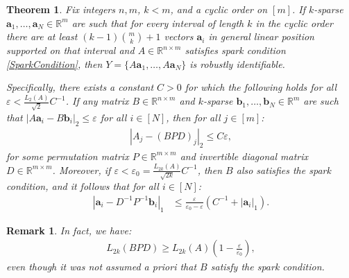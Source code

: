 \documentclass[journal, twocolumn]{IEEEtran}
\newtheorem{theorem}{Theorem}
\newtheorem{remark}{Remark}
\begin{document}
\begin{theorem}\label{DeterministicUniquenessTheorem}
Fix integers $n, m$, $k < m$, and a cyclic order on $[m]$. If $k$-sparse $\mathbf{a}_1, \ldots, \mathbf{a}_N \in \mathbb{R}^m$ are such that for every interval of length $k$ in the cyclic order there are at least \mbox{$(k-1){m \choose k}+1$} vectors $\mathbf{a}_i$ in general linear position supported on that interval and $A \in \mathbb{R}^{n \times m}$ satisfies spark condition \eqref{SparkCondition}, then $Y = \{A\mathbf{a}_1, \ldots, A\mathbf{a}_N\}$ is robustly identifiable.

Specifically, there exists a constant $C > 0$ for which the following holds for all $\varepsilon < \frac{L_2(A)}{\sqrt{2}}C^{-1}$. If any matrix $B \in \mathbb{R}^{n \times m}$ and $k$-sparse $\mathbf{b}_1, \ldots, \mathbf{b}_N \in \mathbb{R}^m$ are such that \mbox{$|A\mathbf{a}_i - B\mathbf{b}_i|_2 \leq \varepsilon$} for all $i \in [N]$, then for all $j \in [m]$:
\begin{align}\label{Cstable}
|A_j-(BPD)_j|_2 \leq C\varepsilon,
\end{align}
%
for some permutation matrix $P \in \mathbb{R}^{m \times m}$ and invertible diagonal matrix $D \in \mathbb{R}^{m \times m}$.  Moreover, if $\varepsilon < \varepsilon_0  = \frac{L_{2k}(A)}{\sqrt{2k}}C^{-1}$, then $B$ also satisfies the spark condition, and it follows that for all $i \in [N]$:
\begin{align}\label{b-PDa}
|\mathbf{a}_i - D^{-1}P^{-1}\mathbf{b}_i|_1 &\leq \frac{\varepsilon }{ \varepsilon_0 - \varepsilon} \left( C^{-1}+|\mathbf{a}_i|_1 \right).
\end{align}
\end{theorem}

\begin{remark}
In fact, we have:
\begin{align}
L_{2k}(BPD) \geq L_{2k}(A)\left( 1 - \frac{\varepsilon}{\varepsilon_0} \right),
\end{align}
%
even though it was not assumed a priori that $B$ satisfy the spark condition.
\end{remark}


\end{document}
